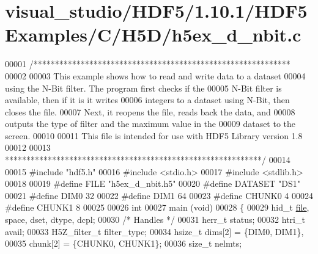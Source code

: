 \hypertarget{visual__studio_2_h_d_f5_21_810_81_2_h_d_f5_examples_2_c_2_h5_d_2h5ex__d__nbit_8c_source}{}\section{visual\+\_\+studio/\+H\+D\+F5/1.10.1/\+H\+D\+F5\+Examples/\+C/\+H5\+D/h5ex\+\_\+d\+\_\+nbit.c}
\label{visual__studio_2_h_d_f5_21_810_81_2_h_d_f5_examples_2_c_2_h5_d_2h5ex__d__nbit_8c_source}

\begin{DoxyCode}
00001 \textcolor{comment}{/************************************************************}
00002 \textcolor{comment}{}
00003 \textcolor{comment}{  This example shows how to read and write data to a dataset}
00004 \textcolor{comment}{  using the N-Bit filter.  The program first checks if the}
00005 \textcolor{comment}{  N-Bit filter is available, then if it is it writes}
00006 \textcolor{comment}{  integers to a dataset using N-Bit, then closes the file.}
00007 \textcolor{comment}{  Next, it reopens the file, reads back the data, and}
00008 \textcolor{comment}{  outputs the type of filter and the maximum value in the}
00009 \textcolor{comment}{  dataset to the screen.}
00010 \textcolor{comment}{}
00011 \textcolor{comment}{  This file is intended for use with HDF5 Library version 1.8}
00012 \textcolor{comment}{}
00013 \textcolor{comment}{ ************************************************************/}
00014 
00015 \textcolor{preprocessor}{#include "hdf5.h"}
00016 \textcolor{preprocessor}{#include <stdio.h>}
00017 \textcolor{preprocessor}{#include <stdlib.h>}
00018 
00019 \textcolor{preprocessor}{#define FILE            "h5ex\_d\_nbit.h5"}
00020 \textcolor{preprocessor}{#define DATASET         "DS1"}
00021 \textcolor{preprocessor}{#define DIM0            32}
00022 \textcolor{preprocessor}{#define DIM1            64}
00023 \textcolor{preprocessor}{#define CHUNK0          4}
00024 \textcolor{preprocessor}{#define CHUNK1          8}
00025 
00026 \textcolor{keywordtype}{int}
00027 main (\textcolor{keywordtype}{void})
00028 \{
00029     hid\_t           \hyperlink{structfile}{file}, space, dset, dtype, dcpl;
00030                                                 \textcolor{comment}{/* Handles */}
00031     herr\_t          status;
00032     htri\_t          avail;
00033     H5Z\_filter\_t    filter\_type;
00034     hsize\_t         dims[2] = \{DIM0, DIM1\},
00035                     chunk[2] = \{CHUNK0, CHUNK1\};
00036     \textcolor{keywordtype}{size\_t}          nelmts;

\end{DoxyCode}
